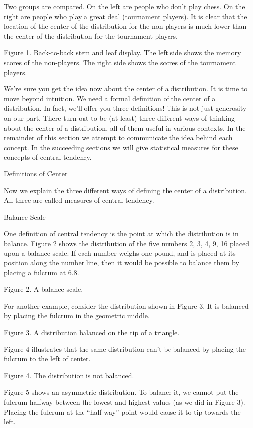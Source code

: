 \documentclass[
]{book}
\begin{document}
Two groups are compared. On the left are people who don't play chess. On the right are people who play a great deal (tournament players). It is clear that the location of the center of the distribution for the non-players is much lower than the center of the distribution for the tournament players.

Figure 1. Back-to-back stem and leaf display. The left side shows the memory scores of the non-players. The right side shows the scores of the tournament players.

We're sure you get the idea now about the center of a distribution. It is time to move beyond intuition. We need a formal definition of the center of a distribution. In fact, we'll offer you three definitions! This is not just generosity on our part. There turn out to be (at least) three different ways of thinking about the center of a distribution, all of them useful in various contexts. In the remainder of this section we attempt to communicate the idea behind each concept. In the succeeding sections we will give statistical measures for these concepts of central tendency.

Definitions of Center

Now we explain the three different ways of defining the center of a distribution. All three are called measures of central tendency.

Balance Scale

One definition of central tendency is the point at which the distribution is in balance. Figure 2 shows the distribution of the five numbers 2, 3, 4, 9, 16 placed upon a balance scale. If each number weighs one pound, and is placed at its position along the number line, then it would be possible to balance them by placing a fulcrum at 6.8.

Figure 2. A balance scale.

For another example, consider the distribution shown in Figure 3. It is balanced by placing the fulcrum in the geometric middle.

Figure 3. A distribution balanced on the tip of a triangle.

Figure 4 illustrates that the same distribution can't be balanced by placing the fulcrum to the left of center.

Figure 4. The distribution is not balanced.

Figure 5 shows an asymmetric distribution. To balance it, we cannot put the fulcrum halfway between the lowest and highest values (as we did in Figure 3). Placing the fulcrum at the ``half way'' point would cause it to tip towards the left.
\end{document}
